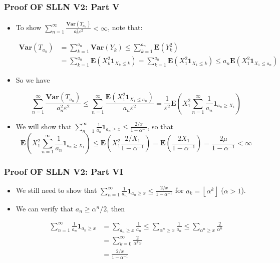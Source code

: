 \documentclass[handout]{beamer}
\newcommand{\BE}{\mathbf{E}}
\newcommand{\BI}{\mathbf{1}}
\newcommand{\BV}{\mathbf{Var}}
\begin{document}
\frame
{
  \frametitle{Proof OF SLLN V2: Part V}

   \begin{itemize}
   \item<1-> To show $\sum_{n=1}^{\infty}\frac{\BV(T_{a_n})}{a_n^2 \varepsilon^2}<\infty$,  note that:
   
   \begin{align*} \BV(T_{a_n})& =\sum_{k=1}^{a_n} \BV(Y_k) \leq \sum_{k=1}^{a_n} \BE(Y_k^2) \\ & = \sum_{k=1}^{a_n} \BE(X_k^2 \BI_{X_k\leq k})= \sum_{k=1}^{a_n} \BE(X_1^2 \BI_{X_1\leq k}) \leq a_n \BE(X_1^2 \BI_{X_1\leq a_n} ) \end {align*} 
       
        
    \item<2->[-] So we have 
    
    $$\sum_{n=1}^{\infty}\frac{\BV(T_{a_n})}{a_n^2 \varepsilon^2}\leq \sum_{n=1}^{\infty} \frac{ \BE(X_1^2 \BI_{X_1\leq a_n} )}{a_n \varepsilon^2} = \frac{1}{\varepsilon^2} \BE(X_1^2 \sum_{n=1}^{\infty} \frac{1}{a_n}  \BI_{a_n\geq X_1} )$$
    
    
        
        \item<3->[-] We will show that $\sum_{n=1}^{\infty} \frac{1}{a_n}  \BI_{a_n\geq x} \leq \frac{2/x}{1-\alpha^{-1}}$, so that 
        $$\BE(X_1^2 \sum_{n=1}^{\infty} \frac{1}{a_n}  \BI_{a_n\geq X_1} )\leq \BE(X_1^2  \frac{2/X_1}{1-\alpha^{-1}} )=\BE(\frac{2X_1}{1-\alpha^{-1}})=\frac{2\mu}{1-\alpha^{-1}}<\infty$$
        
                                                        
\end{itemize}
}



\frame
{
  \frametitle{Proof OF SLLN V2: Part VI}

   \begin{itemize}
   \item<1-> We still need to show that $\sum_{n=1}^{\infty} \frac{1}{a_n}  \BI_{a_n\geq x} \leq \frac{2/x}{1-\alpha^{-1}}$ for $a_k=\left \lfloor{\alpha^k}\right \rfloor$ ($\alpha>1$). 
     
     \item<2-> We can verify that $a_n\geq \alpha^n/2$, then 
     
     \begin{align*}
     \sum_{n=1}^{\infty} \frac{1}{a_n}\BI_{a_n\geq x} &  =\sum_{a_n\geq x} \frac{1}{a_n} \leq \sum_{\alpha^n \geq x} \frac{1}{a_n}  \leq \sum_{\alpha^n \geq x} \frac{2}{\alpha^n } \\ 
     & = \sum_{k=0}^{\infty} \frac{2}{\alpha^{k}x } \\
     &=\frac{2/x}{ 1-\alpha^{-1}} 
     \end{align*}
                                                               
\end{itemize}
}
\end{document}
